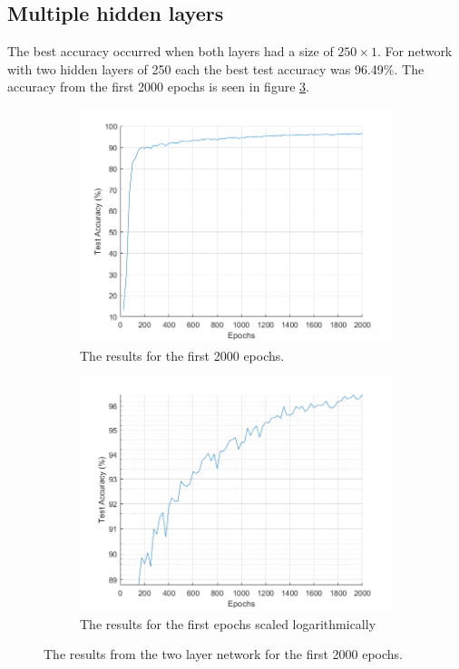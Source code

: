 \documentclass[12pt]{article}
\begin{document}
	\subsection{Multiple hidden layers}
	The best accuracy occurred when both layers had a size of $250\times1$. For network with two hidden layers of 250 each the best test accuracy was 96.49\%. The accuracy from the first 2000 epochs is seen in figure \ref{fig:250_all_l2}. 
		\begin{figure}[H]
		\centering
		\begin{subfigure}{.5\textwidth}
			\centering
			\includegraphics[width=\linewidth]{250_results_l2}
			\caption{The results for the first 2000 epochs.}
			\label{fig:250results_l2}
		\end{subfigure}%
		\begin{subfigure}{.5\textwidth}
			\centering
			\includegraphics[width=\linewidth]{250_results_log_l2}
			\caption{The results for the first epochs scaled logarithmically}
			\label{fig:250resultslog_l2}
		\end{subfigure}
		\caption{The results from the two layer network for the first 2000 epochs.}
		\label{fig:250_all_l2}
	\end{figure}
\end{document}

